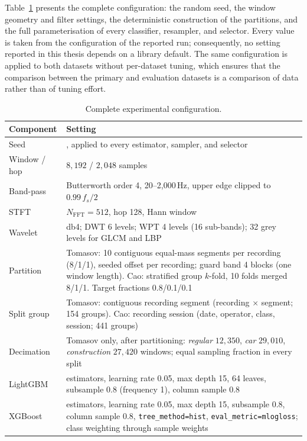 Table~\ref{tab:config} presents the complete configuration: the random seed, the window geometry and filter settings, the deterministic construction of the partitions, and the full parameterisation of every classifier, resampler, and selector. Every value is taken from the configuration of the reported run; consequently, no setting reported in this thesis depends on a library default. The same configuration is applied to both datasets without per-dataset tuning, which ensures that the comparison between the primary and evaluation datasets is a comparison of data rather than of tuning effort.

\begin{table}[!htbp]
	\centering
	\caption{Complete experimental configuration.}
	\label{tab:config}
	\scriptsize
	\setlength{\tabcolsep}{4pt}
	\renewcommand{\arraystretch}{1.1}
	\begin{tabularx}{\textwidth}{@{}>{\raggedright\arraybackslash}p{3.0cm} >{\raggedright\arraybackslash}X@{}}
		\toprule
		\textbf{Component} & \textbf{Setting}\\
		\midrule
		Seed & 42, applied to every estimator, sampler, and selector\\
		Window / hop & $8{,}192$ / $2{,}048$ samples\\
		Band-pass & Butterworth order 4, 20--2{,}000\,Hz, upper edge clipped to $0.99\,f_s/2$\\
		STFT & $N_{\mathrm{FFT}} = 512$, hop 128, Hann window\\
		Wavelet & db4; DWT 6 levels; WPT 4 levels (16 sub-bands); 32 grey levels for GLCM and LBP\\
		Partition & Tomasov: 10 contiguous equal-mass segments per recording (8/1/1), seeded offset per recording; guard band 4 blocks (one window length). Cao: stratified group $k$-fold, 10 folds merged 8/1/1. Target fractions 0.8/0.1/0.1\\
		Split group & Tomasov: contiguous recording segment (recording $\times$ segment; 154 groups). Cao: recording session (date, operator, class, session; 441 groups)\\
		Decimation & Tomasov only, after partitioning: \emph{regular} $12{,}350$, \emph{car} $29{,}010$, \emph{construction} $27{,}420$ windows; equal sampling fraction in every split\\
		LightGBM & 500 estimators, learning rate 0.05, max depth 15, 64 leaves, subsample 0.8 (frequency 1), column sample 0.8\\
		XGBoost & 500 estimators, learning rate 0.05, max depth 15, subsample 0.8, column sample 0.8, \texttt{tree\_method=hist}, \texttt{eval\_metric=mlogloss}; class weighting through sample weights\\

\end{tabularx}
\end{table}
